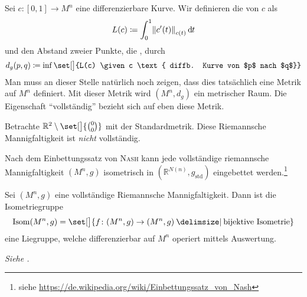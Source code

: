 \begin{erinnerung}[{name=[Riemannsche Metrik]}]
	Sei $c \colon [0,1] \to M^n$ eine differenzierbare Kurve. 
	Wir definieren die  von $c$ als 
	\[
		L(c) \coloneqq \int_0^1 \norm*{c'(t)}_{c(t)} \,\mathd t
	\]
	und den Abstand zweier Punkte, die , durch 
	\[
		d_g(p,q) \coloneqq \inf \set[\big]{L(c) \given c \text{ diffb. Kurve von $p$ nach $q$}}
	\]
	Man muss an dieser Stelle natürlich noch zeigen, dass dies tatsächlich eine Metrik auf $M^n$ definiert.
	Mit dieser Metrik wird $(M^n,d_g)$ ein metrischer Raum.
	Die Eigenschaft \enquote{vollständig} bezieht sich auf eben diese Metrik.
\end{erinnerung}

\begin{beispiel*}[{name=[nicht vollständige Riemannsche Mannigfaltigkeit]}]
	Betrachte $\mathbb{R}^2 \setminus \set[\big]{\binom{0}{0}}$ mit der Standardmetrik. 
	Diese Riemannsche Mannigfaltigkeit ist \emph{nicht} vollständig.
\end{beispiel*}

\begin{bemerkung*}[{name=[Einbettungssatz von Nash]}]
	Nach dem Einbettungssatz von \textsc{Nash} kann jede vollständige riemannsche Mannigfaltigkeit $(M^n,g)$ isometrisch in $(\mathbb{R}^{N(n)},g_{\mathrm{std}})$ eingebettet werden.\footnote{siehe \url{https://de.wikipedia.org/wiki/Einbettungssatz_von_Nash}}
\end{bemerkung*}

\begin{satz}[{name={Myers-Steenrod}}]
	Sei $(M^n,g)$ eine vollständige Riemannsche Mannigfaltigkeit.
	Dann ist die Isometriegruppe 
	\[
		\Isom(M^n,g) = \set[\big]{f \colon (M^n,g) \to (M^n,g) \given \text{bijektive Isometrie}}
	\]
	eine Liegruppe, welche differenzierbar auf $M^n$ operiert mittels Auswertung.
\end{satz}
\begin{beweis}
	\emph{Siehe \textcite{MyersSteenrod}.}
\end{beweis}

